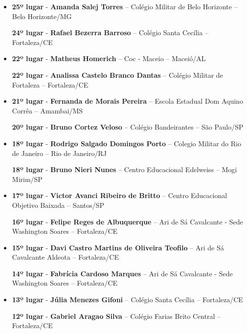 \documentclass{article}
\begin{document}
\begin{itemize}
\item
\textbf{25º lugar} - \textbf{Amanda Salej Torres} – Colégio Militar de Belo Horizonte – Belo Horizonte/MG

\textbf{24º lugar} - \textbf{Rafael Bezerra Barroso} – Colégio Santa Cecília – Fortaleza/CE



\item
\textbf{22º lugar} - \textbf{Matheus Homerich} – Coc - Maceio – Maceió/AL


\textbf{22º lugar} - \textbf{Analissa Castelo Branco Dantas} – Colégio Militar de Fortaleza – Fortaleza/CE



\item
\textbf{21º lugar} - \textbf{Fernanda de Morais Pereira} – Escola Estadual Dom Aquino Corrêa – Amambai/MS


\textbf{20º lugar} - \textbf{Bruno Cortez Veloso} – Colégio Bandeirantes – São Paulo/SP



\item
\textbf{18º lugar} - \textbf{Rodrigo Salgado Domingos Porto} – Colegio Militar do Rio de Janeiro – Rio de Janeiro/RJ


\textbf{18º lugar} - \textbf{Bruno Nieri Nunes} – Centro Educacional Edelweiss – Mogi Mirim/SP



\item
\textbf{17º lugar} - \textbf{Victor Avanci Ribeiro de Britto} – Centro Educacional Objetivo Baixada – Santos/SP


\textbf{16º lugar} - \textbf{Felipe Reges de Albuquerque} – Ari de Sá Cavalcante - Sede Washington Soares – Fortaleza/CE



\item
\textbf{15º lugar} - \textbf{Davi Castro Martins de Oliveira Teofilo} – Ari de Sá Cavalcante Aldeota – Fortaleza/CE


\textbf{14º lugar} - \textbf{Fabrícia Cardoso Marques} – Ari de Sá Cavalcante - Sede Washington Soares – Fortaleza/CE



\item
\textbf{13º lugar} - \textbf{Júlia Menezes Gifoni} – Colégio Santa Cecília – Fortaleza/CE


\textbf{12º lugar} - \textbf{Gabriel Aragao Silva} – Colégio Farias Brito Central – Fortaleza/CE




\end{itemize}
\end{document}

